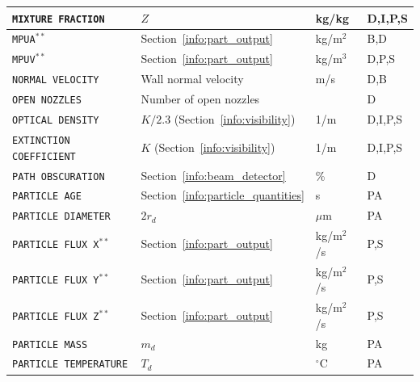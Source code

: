 \documentclass[11pt]{book}
\newcommand{\ct}{\tt\small}
\begin{document}
\begin{longtable}{@{\extracolsep{\fill}}|l|l|l|l|}
{\ct MIXTURE FRACTION}                          & $Z$                                           & kg/kg          & D,I,P,S      \\ \hline
{\ct MPUA}$^{**}$                               & Section~\ref{info:part_output}                & kg/m$^2$       & B,D          \\ \hline
{\ct MPUV}$^{**}$                               & Section~\ref{info:part_output}                & kg/m$^3$       & D,P,S        \\ \hline
{\ct NORMAL VELOCITY}                           & Wall normal velocity                          & m/s            & D,B          \\ \hline
{\ct OPEN NOZZLES}                              & Number of open nozzles                        &                & D            \\ \hline
{\ct OPTICAL DENSITY}                           & $K/2.3$ (Section~\ref{info:visibility})       & 1/m            & D,I,P,S      \\ \hline
{\ct EXTINCTION COEFFICIENT}                    & $K$ (Section~\ref{info:visibility})           & 1/m            & D,I,P,S      \\ \hline
{\ct PATH OBSCURATION}                          & Section~\ref{info:beam_detector}              & \%             & D            \\ \hline
{\ct PARTICLE AGE}                              & Section~\ref{info:particle_quantities}        & s              & PA           \\ \hline
{\ct PARTICLE DIAMETER}                         & $2 r_d$                                       & $\mu$m         & PA           \\ \hline
{\ct PARTICLE FLUX X}$^{**}$                    & Section~\ref{info:part_output}                & kg/m$^2$/s     & P,S          \\ \hline
{\ct PARTICLE FLUX Y}$^{**}$                    & Section~\ref{info:part_output}                & kg/m$^2$/s     & P,S          \\ \hline
{\ct PARTICLE FLUX Z}$^{**}$                    & Section~\ref{info:part_output}                & kg/m$^2$/s     & P,S          \\ \hline
{\ct PARTICLE MASS}                             & $m_d$                                         & kg             & PA           \\ \hline
{\ct PARTICLE TEMPERATURE}                      & $T_d$                                         & $^\circ$C      & PA           \\ \hline

\end{longtable}
\end{document}
